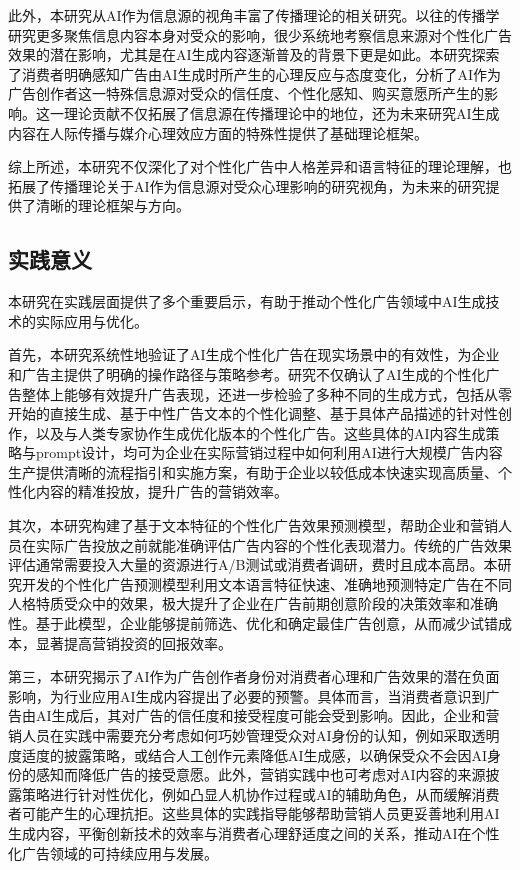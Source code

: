 此外，本研究从AI作为信息源的视角丰富了传播理论的相关研究。以往的传播学研究更多聚焦信息内容本身对受众的影响，很少系统地考察信息来源对个性化广告效果的潜在影响，尤其是在AI生成内容逐渐普及的背景下更是如此。本研究探索了消费者明确感知广告由AI生成时所产生的心理反应与态度变化，分析了AI作为广告创作者这一特殊信息源对受众的信任度、个性化感知、购买意愿所产生的影响。这一理论贡献不仅拓展了信息源在传播理论中的地位，还为未来研究AI生成内容在人际传播与媒介心理效应方面的特殊性提供了基础理论框架。

综上所述，本研究不仅深化了对个性化广告中人格差异和语言特征的理论理解，也拓展了传播理论关于AI作为信息源对受众心理影响的研究视角，为未来的研究提供了清晰的理论框架与方向。

\subsection{实践意义}

本研究在实践层面提供了多个重要启示，有助于推动个性化广告领域中AI生成技术的实际应用与优化。

首先，本研究系统性地验证了AI生成个性化广告在现实场景中的有效性，为企业和广告主提供了明确的操作路径与策略参考。研究不仅确认了AI生成的个性化广告整体上能够有效提升广告表现，还进一步检验了多种不同的生成方式，包括从零开始的直接生成、基于中性广告文本的个性化调整、基于具体产品描述的针对性创作，以及与人类专家协作生成优化版本的个性化广告。这些具体的AI内容生成策略与prompt设计，均可为企业在实际营销过程中如何利用AI进行大规模广告内容生产提供清晰的流程指引和实施方案，有助于企业以较低成本快速实现高质量、个性化内容的精准投放，提升广告的营销效率。

其次，本研究构建了基于文本特征的个性化广告效果预测模型，帮助企业和营销人员在实际广告投放之前就能准确评估广告内容的个性化表现潜力。传统的广告效果评估通常需要投入大量的资源进行A/B测试或消费者调研，费时且成本高昂。本研究开发的个性化广告预测模型利用文本语言特征快速、准确地预测特定广告在不同人格特质受众中的效果，极大提升了企业在广告前期创意阶段的决策效率和准确性。基于此模型，企业能够提前筛选、优化和确定最佳广告创意，从而减少试错成本，显著提高营销投资的回报效率。

第三，本研究揭示了AI作为广告创作者身份对消费者心理和广告效果的潜在负面影响，为行业应用AI生成内容提出了必要的预警。具体而言，当消费者意识到广告由AI生成后，其对广告的信任度和接受程度可能会受到影响。因此，企业和营销人员在实践中需要充分考虑如何巧妙管理受众对AI身份的认知，例如采取透明度适度的披露策略，或结合人工创作元素降低AI生成感，以确保受众不会因AI身份的感知而降低广告的接受意愿。此外，营销实践中也可考虑对AI内容的来源披露策略进行针对性优化，例如凸显人机协作过程或AI的辅助角色，从而缓解消费者可能产生的心理抗拒。这些具体的实践指导能够帮助营销人员更妥善地利用AI生成内容，平衡创新技术的效率与消费者心理舒适度之间的关系，推动AI在个性化广告领域的可持续应用与发展。
